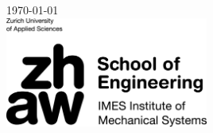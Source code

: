 \begin{titlepage}


{\large \today}\\[2cm] %


\includegraphics[width=0.5\textwidth]{img/en-zhaw-imes-sw.png}\\[2cm] %

 

\vfill %

\end{titlepage}
